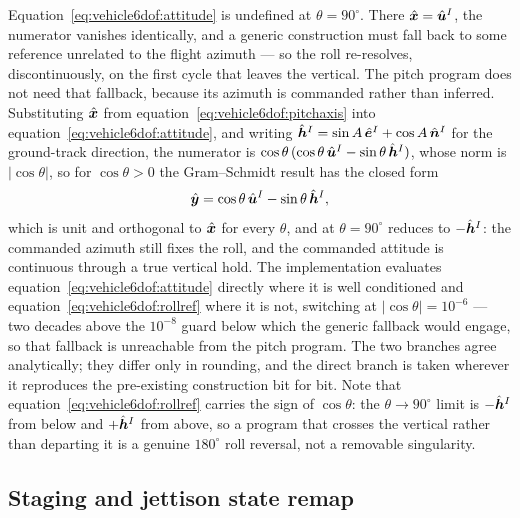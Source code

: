 Equation~\eqref{eq:vehicle6dof:attitude} is undefined at $\theta =
90^{\circ}$. There $\hat{\bm{x}} = \hat{\bm{u}}^{I}$, the numerator vanishes
identically, and a generic construction must fall back to some reference
unrelated to the flight azimuth --- so the roll re-resolves, discontinuously,
on the first cycle that leaves the vertical. The pitch program does not need
that fallback, because its azimuth is commanded rather than inferred.
Substituting $\hat{\bm{x}}$ from equation~\eqref{eq:vehicle6dof:pitchaxis}
into equation~\eqref{eq:vehicle6dof:attitude}, and writing $\hat{\bm{h}}^{I} =
\sin A\,\hat{\bm{e}}^{I} + \cos A\,\hat{\bm{n}}^{I}$ for the ground-track
direction, the numerator is $\cos\theta\,(\cos\theta\,\hat{\bm{u}}^{I} -
\sin\theta\,\hat{\bm{h}}^{I})$, whose norm is $\lvert\cos\theta\rvert$, so for
$\cos\theta > 0$ the Gram--Schmidt result has the closed form
\begin{equation}
  \hat{\bm{y}} = \cos\theta\,\hat{\bm{u}}^{I}
    - \sin\theta\,\hat{\bm{h}}^{I},
  \label{eq:vehicle6dof:rollref}
\end{equation}
which is unit and orthogonal to $\hat{\bm{x}}$ for every $\theta$, and at
$\theta = 90^{\circ}$ reduces to $-\hat{\bm{h}}^{I}$: the commanded azimuth
still fixes the roll, and the commanded attitude is continuous through a true
vertical hold. The implementation evaluates
equation~\eqref{eq:vehicle6dof:attitude} directly where it is well
conditioned and equation~\eqref{eq:vehicle6dof:rollref} where it is not,
switching at $\lvert\cos\theta\rvert = 10^{-6}$ --- two decades above the
$10^{-8}$ guard below which the generic fallback would engage, so that
fallback is unreachable from the pitch program. The two branches agree
analytically; they differ only in rounding, and the direct branch is taken
wherever it reproduces the pre-existing construction bit for bit. Note that
equation~\eqref{eq:vehicle6dof:rollref} carries the sign of $\cos\theta$: the
$\theta \to 90^{\circ}$ limit is $-\hat{\bm{h}}^{I}$ from below and
$+\hat{\bm{h}}^{I}$ from above, so a program that crosses the vertical rather
than departing it is a genuine $180^{\circ}$ roll reversal, not a removable
singularity.

\subsection{Staging and jettison state remap}


